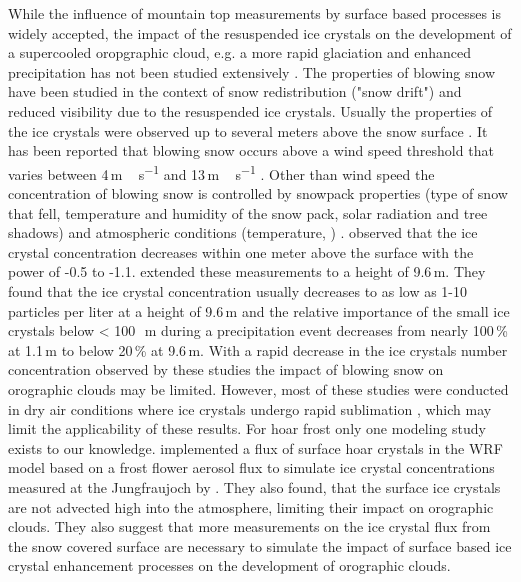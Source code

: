 \documentclass[draft,linenumbers]{agujournal}
\begin{document}
While the influence of mountain top measurements by surface based processes is widely accepted, the impact of the resuspended ice crystals on the development of a supercooled oropgraphic cloud, e.g. a more rapid glaciation and enhanced precipitation has not been studied extensively \citep{Gee15}. The properties of blowing snow have been studied in the context of snow redistribution ("snow drift") and reduced visibility due to the resuspended ice crystals. Usually the properties of the ice crystals were observed up to several meters above the snow surface \citet{Sch82, Nis05}. It has been reported that blowing snow occurs above a wind speed threshold that varies between 4\,\si{m\,s^{-1}} and 13\,\si{m\,s^{-1}} \citep{Bro88, Li97, Mah03, Der99}. Other than wind speed the concentration of blowing snow is controlled by snowpack properties (type of snow that fell, temperature and humidity of the snow pack, solar radiation and tree shadows) and atmospheric conditions (temperature, ) \citep{Vio13}. \citet{Sch82} observed that the ice crystal concentration decreases within one meter above the surface with the power of -0.5 to -1.1. \citet{Nis05} extended these measurements to a height of 9.6\,\si{m}. They found that the ice crystal concentration usually decreases to as low as 1-10 particles per liter at a height of 9.6\,\si{m} and the relative importance of the small ice crystals below < 100\,\si{\mu m} during a precipitation event decreases from nearly 100\,\si{\%} at 1.1\,\si{m} to below 20\,\si{\%} at 9.6\,\si{m}. With a rapid decrease in the ice crystals number concentration observed by these studies the impact of blowing snow on orographic clouds may be limited. However, most of these studies were conducted in dry air conditions where ice crystals undergo rapid sublimation \citep{Yan08}, which may limit the applicability of these results. For hoar frost only one modeling study exists to our knowledge. \citet{Far15} implemented a flux of surface hoar crystals in the WRF model based on a frost flower aerosol flux to simulate ice crystal concentrations measured at the Jungfraujoch by \citet{Llo15}. They also found, that the surface ice crystals are not advected high into the atmosphere, limiting their impact on orographic clouds. They also suggest that more measurements on the ice crystal flux from the snow covered surface are necessary to simulate the impact of surface based ice crystal enhancement processes on the development of orographic clouds.
\end{document}
